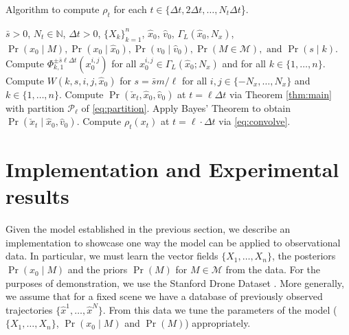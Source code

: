 \documentclass[letterpaper,10pt,conference]{ieeeconf}
\begin{document}
\begin{algorithm}[t]
		  \caption{Algorithm to compute  $\rho_t$ for each $t \in  \{\Delta t, 2 \Delta t, \dots, N_t \Delta t$\}.}
		  \label{alg:1}
		  \begin{algorithmic}[1]
		    \Require $\bar{s} > 0$, $N_t \in \mathbb{N}$, $\Delta t > 0$,  $ \{ X_k \}_{k=1}^{n}$, $\hat{x}_0$, $\hat{v}_0$, $\Gamma_L( \hat{x}_0, N_x)$, $\Pr(x_0 \mid M), \Pr(x_0 \mid \hat{x}_0), \Pr(v_0 \mid \hat{v}_0 ), \Pr(M \in \mathcal{M}), \text{ and } \Pr(s \mid k)$.
		    \State Compute $\Phi_{k,1}^{ \pm \bar{s} \ell \Delta t}( x_0^{i,j} )$ for all $x_0^{i,j} \in \Gamma_L( \hat{x}_0 ; N_x)$ and \hspace*{12pt} for all $k \in  \{1,\dots, n\}$.
		    \State Compute $W(k,s,i,j,\hat{x}_0)$ for $s = \bar{s} m / \ell$ for all \hspace*{28pt} $i,j\in \{-N_x,\dots, N_x\}$ and $k\in \{1,\dots,n\}$.
		    \EndFor  
		    \State Compute $\Pr(\check{x}_t, \hat{x}_0, \hat{v}_0)$ at $t=\ell \Delta t$ via Theorem \ref{thm:main} 
		    \hspace*{12pt} with partition $\mathcal{P}_\ell$ of \eqref{eq:partition}.\label{alg1:step2}
		    \State Apply Bayes' Theorem to obtain $\Pr(\check{x}_t \mid \hat{x}_0, \hat{v}_0)$.
		    \State Compute $\rho_t(x_t)$ at $t= \ell \cdot \Delta t$ via \eqref{eq:convolve}.
		    \EndFor
		  \end{algorithmic}
\end{algorithm}

  
\section{Implementation and Experimental results} \label{sec:implementation}
  Given the model established in the previous section, we describe an implementation to showcase one way the model can be applied to observational data.
  In particular, we must learn the vector fields $\{X_1, \dots, X_n\}$, the posteriors $\Pr( x_0 \mid M)$ and the priors $\Pr(M)$ for $M \in \mathcal{M}$ from the data.
  For the purposes of demonstration, we use the Stanford Drone Dataset \cite{Robicquet2016}.
  More generally, we assume that for a fixed scene we have a database of previously observed trajectories $\{ \hat{x}^1, \dots, \hat{x}^N\}$.
  From this data we tune the parameters of the model ($\{X_1, \dots, X_n\}$, $\Pr( x_0 \mid M)$ and $\Pr(M)$)  appropriately.
  
\end{document}
